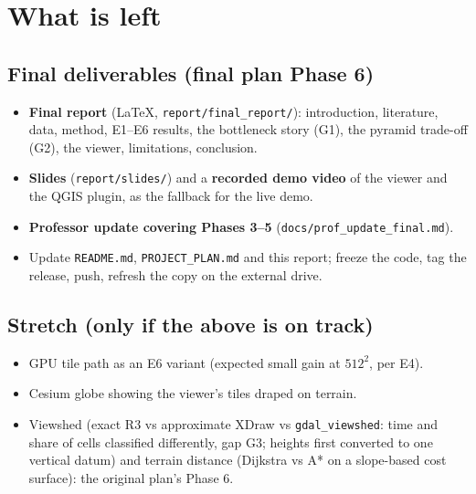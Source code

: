 ﻿\documentclass[11pt,a4paper]{article}
\newcommand{\code}[1]{\texttt{#1}}
\begin{document}
\section{What is left}\label{sec:future}
\subsection{Final deliverables (final plan Phase 6)}
\begin{itemize}
  \item \textbf{Final report} (LaTeX, \code{report/final\_report/}): introduction, literature, data, method, E1--E6 results,
  the bottleneck story (G1), the pyramid trade-off (G2), the viewer, limitations, conclusion.
  \item \textbf{Slides} (\code{report/slides/}) and a \textbf{recorded demo video} of the viewer and the QGIS plugin, as the
  fallback for the live demo.
  \item \textbf{Professor update covering Phases 3--5} (\code{docs/prof\_update\_final.md}).
  \item Update \code{README.md}, \code{PROJECT\_PLAN.md} and this report; freeze the code, tag the release, push, refresh
  the copy on the external drive.
\end{itemize}

\subsection{Stretch (only if the above is on track)}
\begin{itemize}
  \item GPU tile path as an E6 variant (expected small gain at $512^2$, per E4).
  \item Cesium globe showing the viewer's tiles draped on terrain.
  \item Viewshed (exact R3 vs approximate XDraw vs \code{gdal\_viewshed}: time and share of cells classified differently,
  gap G3; heights first converted to one vertical datum) and terrain distance (Dijkstra vs A* on a slope-based cost
  surface): the original plan's Phase 6.
\end{itemize}
\end{document}
